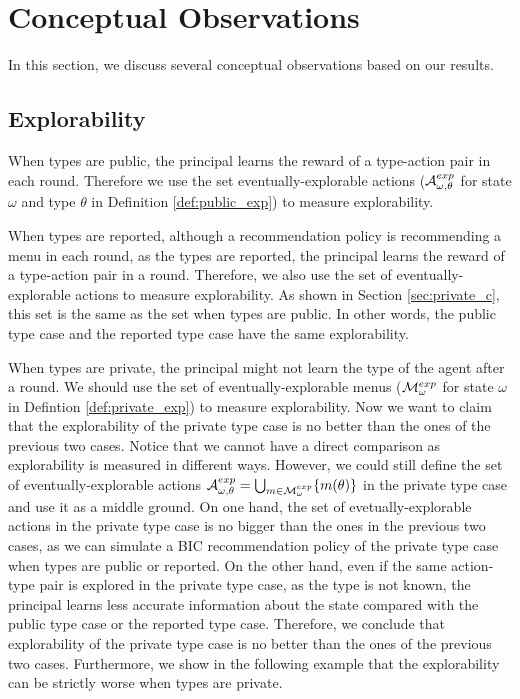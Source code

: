 
\section{Conceptual Observations}
In this section, we discuss several conceptual observations based on our results.

\subsection{Explorability}
\label{sec:exp}
When types are public, the principal learns the reward of a type-action pair in each round. Therefore we use the set eventually-explorable actions ($\mathcal{A}^{exp}_{\omega,\theta}$ for state $\omega$ and type $\theta$ in Definition \ref{def:public_exp}) to measure explorability.

When types are reported, although a recommendation policy is recommending a menu in each round, as the types are reported, the principal learns the reward of a type-action pair in a round. Therefore, we also use the set of eventually-explorable actions to measure explorability. As shown in Section \ref{sec:private_c}, this set is the same as the set when types are public. In other words, the public type case and the reported type case have the same explorability.

When types are private, the principal might not learn the type of the agent after a round. We should use the set of eventually-explorable menus ($\mathcal{M}^{exp}_{\omega}$ for state $\omega$ in Defintion \ref{def:private_exp}) to measure explorability. Now we want to claim that the explorability of the private type case is no better than the ones of the previous two cases. Notice that we cannot have a direct comparison as explorability is measured in different ways. However, we could still define the set of eventually-explorable actions $\mathcal{A}^{exp}_{\omega,\theta} = \bigcup_{m\in \mathcal{M}^{exp}_{\omega}} \{ m(\theta)\}$ in the private type case and use it as a middle ground. On one hand, the set of evetually-explorable actions in the private type case is no bigger than the ones in the previous two cases, as we can simulate a BIC recommendation policy of the private type case when types are public or reported. On the other hand, even if the same action-type pair is explored in the private type case, as the type is not known, the principal learns less accurate information about the state compared with the public type case or the reported type case. Therefore, we conclude that explorability of the private type case is no better than the ones of the previous two cases.  Furthermore, we show in the following example that the explorability can be strictly worse when types are private.

